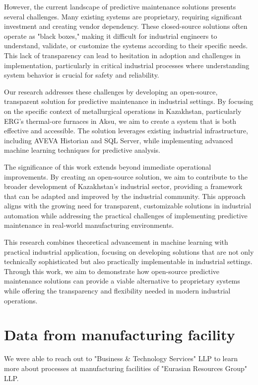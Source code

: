 However, the current landscape of predictive maintenance solutions presents several challenges. Many existing systems are proprietary, requiring significant investment and creating vendor dependency. These closed-source solutions often operate as "black boxes," making it difficult for industrial engineers to understand, validate, or customize the systems according to their specific needs. This lack of transparency can lead to hesitation in adoption and challenges in implementation, particularly in critical industrial processes where understanding system behavior is crucial for safety and reliability.

Our research addresses these challenges by developing an open-source, transparent solution for predictive maintenance in industrial settings. By focusing on the specific context of metallurgical operations in Kazakhstan, particularly ERG's thermal-ore furnaces in Aksu, we aim to create a system that is both effective and accessible. The solution leverages existing industrial infrastructure, including AVEVA Historian and SQL Server, while implementing advanced machine learning techniques for predictive analysis.

The significance of this work extends beyond immediate operational improvements. By creating an open-source solution, we aim to contribute to the broader development of Kazakhstan's industrial sector, providing a framework that can be adapted and improved by the industrial community. This approach aligns with the growing need for transparent, customizable solutions in industrial automation while addressing the practical challenges of implementing predictive maintenance in real-world manufacturing environments.

This research combines theoretical advancement in machine learning with practical industrial application, focusing on developing solutions that are not only technically sophisticated but also practically implementable in industrial settings. Through this work, we aim to demonstrate how open-source predictive maintenance solutions can provide a viable alternative to proprietary systems while offering the transparency and flexibility needed in modern industrial operations.

\section{Data from manufacturing facility}
We were able to reach out to "Business \& Technology Services" LLP to learn more about processes at manufacturing facilities of "Eurasian Resources Group" LLP.

